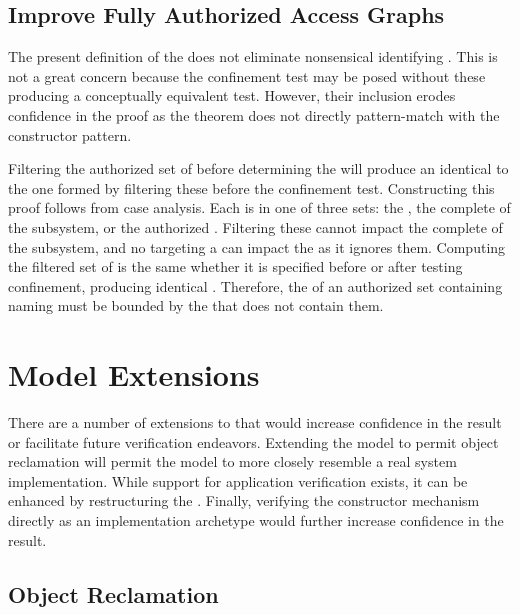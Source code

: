 \subsection{Improve Fully Authorized Access Graphs}
\label{sect:future:filterFullyAuthAG}

The present definition of the \TMagFullyAuthorized{} does not eliminate nonsensical \TMcaps{} identifying \TMdead{} \TMobjs{}.
This is not a great concern because the confinement test may be posed without these \TMcaps{} producing a conceptually equivalent test.
However, their inclusion erodes confidence in the proof as the theorem does not directly pattern-match with the constructor pattern.

Filtering the authorized set of \TMcaps{} before determining the \TMagFullyAuthorized{} will produce an identical \TMaccessGraph{} to the one formed by filtering these \TMcaps{} before the confinement test.
Constructing this proof follows from case analysis.
Each \TMaccessEdge{} is in one of three sets: the \TMagRemainder{}, the complete \TMaccessGraph{} of the subsystem, or the authorized \TMaccessEdges{}.
Filtering these \TMcaps{} cannot impact the complete \TMaccessGraph{} of the subsystem, and no \TMcap{} targeting a \TMdead{} \TMobj{} can impact the \TMdirAccAG{} as it ignores them.
Computing the filtered set of \TMcaps{} is the same whether it is specified before or after testing confinement, producing identical \TMaccessGraphs{}.
Therefore, the \TMmutability{} of an authorized set containing \TMcaps{} naming \TMdead{} \TMobjs{} must be bounded by the \TMagFullyAuthorized{} that does not contain them.

\section{Model Extensions}

There are a number of extensions to \TMmodelName{} that would increase confidence in the result or facilitate future verification endeavors.
Extending the model to permit object reclamation will permit the model to more closely resemble a real system implementation.
While support for application verification exists, it can be enhanced by restructuring the \TMsystemState{}.
Finally, verifying the constructor mechanism directly as an implementation archetype would further increase confidence in the result.

\subsection{Object Reclamation}
\label{sect:future:objReclamation}

